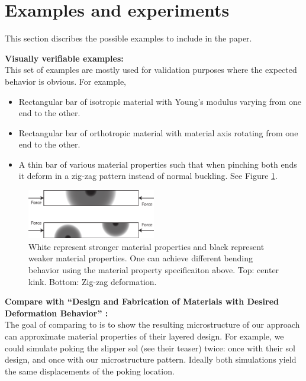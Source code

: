 \section{Examples and experiments}
\label{sec:examples}
This section discribes the possible examples to include in the paper.
\begin{description}
\item{\bf Visually verifiable examples:}\\
This set of examples are mostly used for validation purposes where the expected
behavior is obvious.  For example, 
\begin{itemize}
    \item Rectangular bar of isotropic material with Young's modulus varying from one end
        to the other.
    \item Rectangular bar of orthotropic material with material axis rotating
        from one end to the other.
    \item A thin bar of various material properties such that when pinching both
    ends it deform in a zig-zag pattern instead of normal buckling. See Figure
    \ref{fig:zig_zag_bar}.
\end{itemize}
\begin{figure}
\centering
\includegraphics[width=0.5\textwidth]{images/zig_zag_bar}
\caption{White represent stronger material properties and black represent weaker
material properties.  One can achieve different bending behavior using the
material property specificaiton above.  Top: center kink.  Bottom: Zig-zag
deformation.}
\label{fig:zig_zag_bar}
\end{figure}

\item{\bf Compare with ``Design and Fabrication of Materials with Desired
Deformation Behavior'' \cite{Bickel2010}:}\\
The goal of comparing to \cite{Bickel2010} is to show the resulting
microstructure of our approach can approximate material properties of their
layered design.  For example, we could simulate poking the slipper sol (see
their teaser) twice: once with their sol design, and once with our
microstructure pattern.  Ideally both simulations yield the same displacements
of the poking location.


\end{description}
